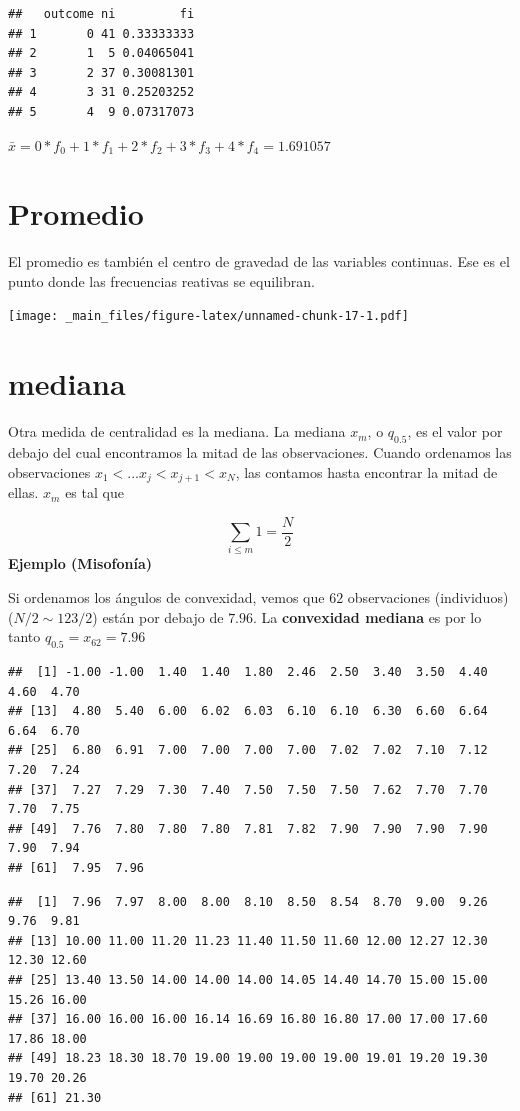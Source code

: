 \documentclass[
]{book}
\begin{document}
\begin{verbatim}
##   outcome ni         fi
## 1       0 41 0.33333333
## 2       1  5 0.04065041
## 3       2 37 0.30081301
## 4       3 31 0.25203252
## 5       4  9 0.07317073
\end{verbatim}

\(\bar{x}=0*f_{0}+1*f_{1}+2*f_{2}+3*f_{3}+4*f_{4}=1.691057\)

\hypertarget{promedio}{%
\section{Promedio}\label{promedio}}

El promedio es también el centro de gravedad de las variables continuas. Ese es el punto donde las frecuencias reativas se equilibran.

\texttt{[image: \_main\_files/figure-latex/unnamed-chunk-17-1.pdf]}

\hypertarget{mediana}{%
\section{mediana}\label{mediana}}

Otra medida de centralidad es la mediana. La mediana \(x_m\), o \(q_{0.5}\), es el valor por debajo del cual encontramos la mitad de las observaciones. Cuando ordenamos las observaciones \(x_1 <... x_j < x_{j+1} < x_N\), las contamos hasta encontrar la mitad de ellas. \(x_m\) es tal que

\[\sum_{i\leq m} 1 = \frac{N}{2}\]
\textbf{Ejemplo (Misofonía)}

Si ordenamos los ángulos de convexidad, vemos que \(62\) observaciones (individuos) (\(N/2 \sim 123/2\)) están por debajo de \(7.96\). La \textbf{convexidad mediana} es por lo tanto \(q_{0.5}=x_{62}=7.96\)

\begin{verbatim}
##  [1] -1.00 -1.00  1.40  1.40  1.80  2.46  2.50  3.40  3.50  4.40  4.60  4.70
## [13]  4.80  5.40  6.00  6.02  6.03  6.10  6.10  6.30  6.60  6.64  6.64  6.70
## [25]  6.80  6.91  7.00  7.00  7.00  7.00  7.02  7.02  7.10  7.12  7.20  7.24
## [37]  7.27  7.29  7.30  7.40  7.50  7.50  7.50  7.62  7.70  7.70  7.70  7.75
## [49]  7.76  7.80  7.80  7.80  7.81  7.82  7.90  7.90  7.90  7.90  7.90  7.94
## [61]  7.95  7.96
\end{verbatim}

\begin{verbatim}
##  [1]  7.96  7.97  8.00  8.00  8.10  8.50  8.54  8.70  9.00  9.26  9.76  9.81
## [13] 10.00 11.00 11.20 11.23 11.40 11.50 11.60 12.00 12.27 12.30 12.30 12.60
## [25] 13.40 13.50 14.00 14.00 14.00 14.05 14.40 14.70 15.00 15.00 15.26 16.00
## [37] 16.00 16.00 16.00 16.14 16.69 16.80 16.80 17.00 17.00 17.60 17.86 18.00
## [49] 18.23 18.30 18.70 19.00 19.00 19.00 19.00 19.01 19.20 19.30 19.70 20.26
## [61] 21.30
\end{verbatim}
\end{document}
